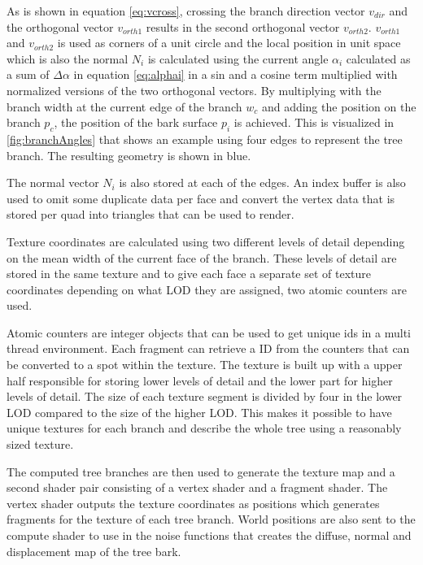 \documentclass[11pt]{article} %
\begin{document}
As is shown in equation \ref{eq:vcross}, crossing the branch direction vector $ v_{dir} $ and the orthogonal vector $ v_{orth1} $ results in the second orthogonal vector $ v_{orth2} $.
$ v_{orth1} $ and $ v_{orth2} $ is used as corners of a unit circle and the local position in unit space which is also the normal $ N_{i} $ is calculated using the current angle $ \alpha_{i} $ calculated as a sum of $ \Delta \alpha $ in equation \ref{eq:alphai} in a sin and a cosine term multiplied with normalized versions of the two orthogonal vectors.
By multiplying with the branch width at the current edge of the branch $ w_{c} $ and adding the position on the branch $ p_{c} $, the position of the bark surface $ p_{i} $ is achieved.
This is visualized in \autoref{fig:branchAngles} that shows an example using four edges to represent the tree branch.
The resulting geometry is shown in blue.


The normal vector $ N_{i} $ is also stored at each of the edges.
An index buffer is also used to omit some duplicate data per face and convert the vertex data that is stored per quad into triangles that can be used to render.

Texture coordinates are calculated using two different levels of detail depending on the mean width of the current face of the branch.
These levels of detail are stored in the same texture and to give each face a separate set of texture coordinates depending on what LOD they are assigned, two atomic counters are used.

Atomic counters are integer objects that can be used to get unique ids in a multi thread environment.
Each fragment can retrieve a ID from the counters that can be converted to a spot within the texture.
The texture is built up with a upper half responsible for storing lower levels of detail and the lower part for higher levels of detail.
The size of each texture segment is divided by four in the lower LOD compared to the size of the higher LOD.
This makes it possible to have unique textures for each branch and describe the whole tree using a reasonably sized texture.

The computed tree branches are then used to generate the texture map and a second shader pair consisting of a vertex shader and a fragment shader.
The vertex shader outputs the texture coordinates as positions which generates fragments for the texture of each tree branch.
World positions are also sent to the compute shader to use in the noise functions that creates the diffuse, normal and displacement map of the tree bark.
\end{document}
